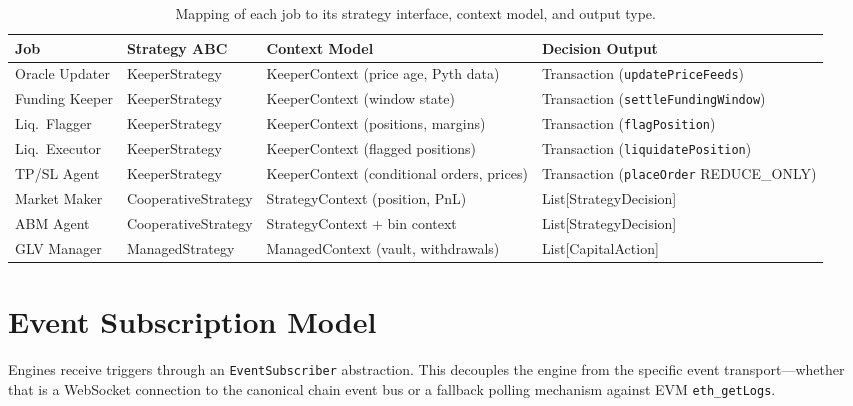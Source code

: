 \documentclass[11pt,a4paper]{article}
\begin{document}
\begin{table}[H]
\centering
\small
\begin{tabularx}{\textwidth}{l l l X}
\toprule
\textbf{Job} & \textbf{Strategy ABC} & \textbf{Context Model} & \textbf{Decision Output} \\
\midrule
\rowcolor{keeper!8}
Oracle Updater & KeeperStrategy & KeeperContext (price age, Pyth data) & Transaction (\texttt{updatePriceFeeds}) \\
\rowcolor{keeper!8}
Funding Keeper & KeeperStrategy & KeeperContext (window state) & Transaction (\texttt{settleFundingWindow}) \\
\rowcolor{keeper!8}
Liq.\ Flagger & KeeperStrategy & KeeperContext (positions, margins) & Transaction (\texttt{flagPosition}) \\
\rowcolor{operator!8}
Liq.\ Executor & KeeperStrategy & KeeperContext (flagged positions) & Transaction (\texttt{liquidatePosition}) \\
\rowcolor{operator!8}
TP/SL Agent & KeeperStrategy & KeeperContext (conditional orders, prices) & Transaction (\texttt{placeOrder} REDUCE\_ONLY) \\
\rowcolor{cooperative!8}
Market Maker & CooperativeStrategy & StrategyContext (position, PnL) & List[StrategyDecision] \\
\rowcolor{cooperative!8}
ABM Agent & CooperativeStrategy & StrategyContext + bin context & List[StrategyDecision] \\
\rowcolor{managed!8}
GLV Manager & ManagedStrategy & ManagedContext (vault, withdrawals) & List[CapitalAction] \\
\bottomrule
\end{tabularx}
\caption{Mapping of each job to its strategy interface, context model, and output type.}
\end{table}

\section{Event Subscription Model}

Engines receive triggers through an \texttt{EventSubscriber} abstraction. This
decouples the engine from the specific event transport---whether that is a WebSocket
connection to the canonical chain event bus or a fallback polling mechanism against
EVM \texttt{eth\_getLogs}.
\end{document}

